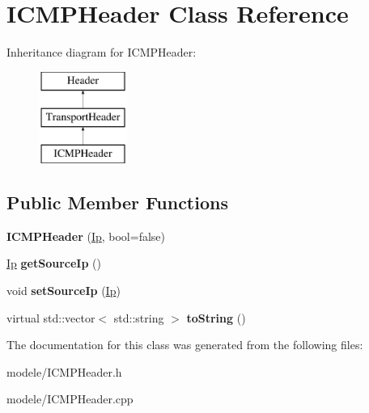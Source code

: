\hypertarget{class_i_c_m_p_header}{\section{I\-C\-M\-P\-Header Class Reference}
\label{class_i_c_m_p_header}
}
Inheritance diagram for I\-C\-M\-P\-Header\-:\begin{figure}[H]
\begin{center}
\leavevmode
\includegraphics[height=3.000000cm]{class_i_c_m_p_header}
\end{center}
\end{figure}
\subsection*{Public Member Functions}
\begin{DoxyCompactItemize}
\item 
\hypertarget{class_i_c_m_p_header_aa357c091dcd2b8279bf7def0e95e4460}{{\bfseries I\-C\-M\-P\-Header} (\hyperlink{class_ip}{Ip}, bool=false)}\label{class_i_c_m_p_header_aa357c091dcd2b8279bf7def0e95e4460}

\item 
\hypertarget{class_i_c_m_p_header_a8b5905d15708c624e5756287578e5ced}{\hyperlink{class_ip}{Ip} {\bfseries get\-Source\-Ip} ()}\label{class_i_c_m_p_header_a8b5905d15708c624e5756287578e5ced}

\item 
\hypertarget{class_i_c_m_p_header_ad28b931dad5810de099d7f996d221f8c}{void {\bfseries set\-Source\-Ip} (\hyperlink{class_ip}{Ip})}\label{class_i_c_m_p_header_ad28b931dad5810de099d7f996d221f8c}

\item 
\hypertarget{class_i_c_m_p_header_a747d5ebf940e135353e9eb821fe9fba0}{virtual std\-::vector$<$ std\-::string $>$ {\bfseries to\-String} ()}\label{class_i_c_m_p_header_a747d5ebf940e135353e9eb821fe9fba0}

\end{DoxyCompactItemize}


The documentation for this class was generated from the following files\-:\begin{DoxyCompactItemize}
\item 
modele/I\-C\-M\-P\-Header.\-h\item 
modele/I\-C\-M\-P\-Header.\-cpp\end{DoxyCompactItemize}
